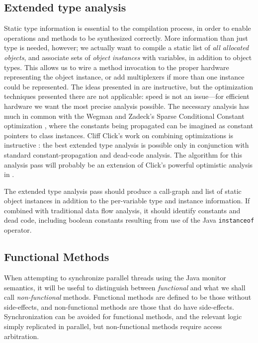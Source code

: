 \documentclass[11pt,notitlepage,twocolumn]{article}
\begin{document}
\subsection{Extended type analysis}
\label{sec:ext_type_analysis}
Static type information is essential to the compilation process, in
order to enable operations and methods to be synthesized correctly.
More information than just type is needed, however; we actually want
to compile a static list of \textit{all allocated objects}, and
associate sets of \textit{object instances} with variables, in
addition to object types.  This allows us to wire a method invocation
to the proper hardware representing the object instance, or add
multiplexers if more than one instance could be represented.  The
ideas presented in \cite{defouw98:classanal} are instructive, but the
optimization techniques presented there are not applicable: speed is
not an issue---for efficient hardware we want the most precise
analysis possible.  The necessary analysis has much in common with
the Wegman and Zadeck's Sparse Conditional Constant optimization
\cite{wegman91:scc}, where the constants being propagated can be
imagined as constant pointers to class instances.  Cliff Click's work
on combining optimizations is instructive \cite{click95:combin}: the
best extended type analysis is possible only in conjunction with
standard constant-propagation and dead-code analysis.  The algorithm
for this analysis pass will probably be an extension of Click's
powerful optimistic analysis in \cite{click95:thesis}.

The extended type analysis pass should produce a call-graph and
list of static object instances in addition to the per-variable type
and instance information.  If combined with traditional data flow
analysis, it should identify constants and dead code, including
boolean constants resulting from use of the Java \texttt{instanceof}
operator.

\subsection{Functional Methods}
When attempting to synchronize parallel threads using the Java monitor
semantics, it will be useful to distinguish between
\textit{functional} and what we shall call \textit{non-functional}
methods.  Functional methods are defined to be those without
side-effects, and non-functional methods are those that do have
side-effects.  Synchronization can be avoided for functional methods,
and the relevant logic simply replicated in parallel, but
non-functional methods require access arbitration.
\end{document}
